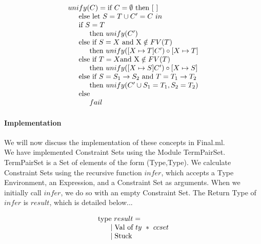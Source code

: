 \documentclass{article}
\begin{document}
\begin{equation*}
\begin{array}{l}
    unify(C) = \text{if} \ C = \emptyset \ \text{then} \ [ \ ] \\
    \indent \text{else let} \ {S = T} \cup C' = C \ in \\
    \indent \text{if} \ S = T \\
    \indent\indent \text{then} \ unify(C') \\
    \indent \text{else if} \ S = X \ \text{and X} \notin FV(T) \\
    \indent\indent \text{then} \ unify([X \mapsto T]C') \circ [X \mapsto T] \\
    \indent \text{else if} \ T = X \text{and X} \notin FV(T) \\
    \indent\indent \text{then} \ unify([X \mapsto S]C') \circ [X \mapsto S] \\
    \indent \text{else if} \ S = S_{1} \to S_{2} \ \text{and} \ T = T_{1} \to T_{2} \\
    \indent\indent \text{then} \ unify(C' \cup {S_{1} = T_{1},S_{2} = T_{2}}) \\
    \indent \text{else} \\
    \indent\indent fail
\end{array}
\end{equation*}

\paragraph{Implementation}
We will now discuss the implementation of these concepts in Final.ml. \\

We have implemented Constraint Sets using the Module TermPairSet. TermPairSet is a Set of elements of the form (Type,Type). We calculate Constraint Sets using the recursive function $infer$, which accepts a Type Environment, an Expression, and a Constraint Set as arguments. When we initially call $infer$, we do so with an empty Constraint Set. The Return Type of $infer$ is $result$, which is detailed below...

\begin{equation}
    \begin{array}{l}
    \text{type} \ result = \\
    \indent \mid \text{Val of} \ ty \ * \ ccset \\
    \indent \mid \text{Stuck}
    \end{array}
\end{equation}
\end{document}

